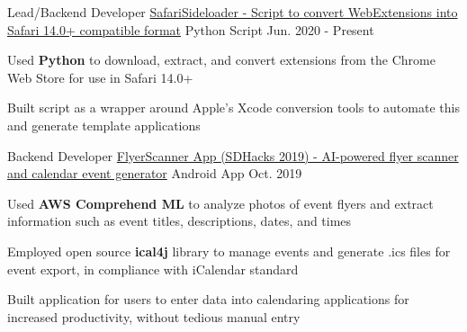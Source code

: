 
\begin{cventries}

  \cventry
    {Lead/Backend Developer} %
    {\href{https://github.com/hexalellogram/SafariSideloader}{SafariSideloader - Script to convert WebExtensions into Safari 14.0+ compatible format}} %
    {Python Script} %
    {Jun. 2020 - Present} %
    {
      \begin{cvitems} %
        \item {Used \textbf{Python} to download, extract, and convert extensions from the Chrome Web Store for use in Safari 14.0+}
        \item {Built script as a wrapper around Apple's Xcode conversion tools to automate this and generate template applications}
      \end{cvitems}
    }

  \cventry
    {Backend Developer} %
    {\href{https://github.com/hexalellogram/CATS-OSS}{FlyerScanner App (SDHacks 2019) - AI-powered flyer scanner and calendar event generator}} %
    {Android App} %
    {Oct. 2019} %
    {
      \begin{cvitems} %
        \item {Used \textbf{AWS Comprehend ML} to analyze photos of event flyers and extract information such as event titles, descriptions, dates, and times}
        \item {Employed open source \textbf{ical4j} library to manage events and generate .ics files for event export, in compliance with iCalendar standard}
        \item {Built application for users to enter data into calendaring applications for increased productivity, without tedious manual entry}
      \end{cvitems}
    }


\end{cventries}
